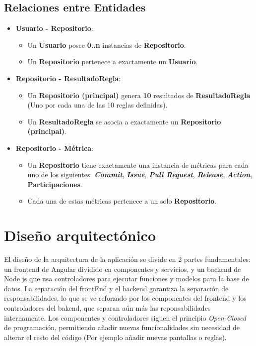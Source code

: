 \subsection{Relaciones entre Entidades}
\begin{itemize}
	\item \textbf{Usuario - Repositorio}:
	\begin{itemize}
		\item Un \textbf{Usuario} posee \textbf{0..n} instancias de \textbf{Repositorio}.
		\item Un \textbf{Repositorio} pertenece a exactamente un \textbf{Usuario}.
	\end{itemize}

    \item \textbf{Repositorio - ResultadoRegla}:
	\begin{itemize}
		\item Un \textbf{Repositorio (principal)} genera \textbf{10} resultados de \textbf{ResultadoRegla} (Uno por cada una de las 10 reglas definidas).
		\item Un \textbf{ResultadoRegla} se asocia a exactamente un \textbf{Repositorio (principal)}.
	\end{itemize}

	\item \textbf{Repositorio - Métrica}:
	\begin{itemize}
		\item Un \textbf{Repositorio} tiene exactamente una instancia de métricas para cada uno de los siguientes: \textbf{\textit{Commit}}, \textbf{\textit{Issue}}, \textbf{\textit{Pull Request}}, \textbf{\textit{Release}}, \textbf{\textit{Action}}, \textbf{Participaciones}.
		\item Cada una de estas métricas pertenece a un solo \textbf{Repositorio}.
	\end{itemize}
\end{itemize}

\section{Diseño arquitectónico}

El diseño de la arquitectura de la aplicación se divide en 2 partes fundamentales: un frontend de Angular dividido en componentes y servicios, y un backend de Node js que usa controladores para ejecutar funciones y modelos para la base de datos. La separación del frontEnd y el backend garantiza la separación de responsabilidades, lo que se ve reforzado por los componentes del frontend y los controladores del bakend, que separan aún más las reponsabilidades internamente. Los componentes y controladores siguen el principio \textit{Open-Closed} de programación, permitiendo añadir nuevas funcionalidades sin necesidad de alterar el resto del código (Por ejemplo añadir nuevas pantallas o reglas).

